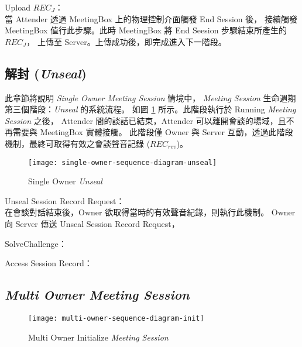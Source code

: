 \begin{steps}
    \item Upload $REC_{J}$：\\
        當 Attender 透過 MeetingBox 上的物理控制介面觸發 End Session 後，
        接續觸發 MeetingBox 值行此步驟。此時 MeetingBox 將 End Seesion 步驟結束所產生的 $REC_{J}$，
        上傳至 Server。上傳成功後，即完成進入下一階段。
\end{steps}


\subsection{解封 ({\it Unseal})}

    此章節將說明 {\it Single Owner Meeting Session} 情境中，
{\it Meeting Session} 生命週期第三個階段：{\it Unseal} 的系統流程。
如圖 \ref{fig.s-o-unseal} 所示。此階段執行於 Running {\it Meeting Session} 之後，
Attender 間的談話已結束，Attender 可以離開會談的場域，且不再需要與 MeetingBox 實體接觸。
此階段僅 Owner 與 Server 互動，透過此階段機制，最終可取得有效之會談聲音記錄 ($REC_{rev}$)。

\begin{figure}[H]
    \centering
    \texttt{[image: single-owner-sequence-diagram-unseal]}
    \caption{Single Owner {\it Unseal}}
    \label{fig.s-o-unseal}
\end{figure}

\begin{steps}
    \item Unseal Session Record Request：\\
        在會談對話結束後，Owner 欲取得當時的有效聲音紀錄，則執行此機制。
        Owner 向 Server 傳送 Unseal Session Record Request，

    \item SolveChallenge：\\

    \item Access Session Record：\\

\end{steps}


\subsection{{\it Multi Owner Meeting Session}}

\begin{figure}[H]
    \centering
    \texttt{[image: multi-owner-sequence-diagram-init]}
    \caption{Multi Owner Initialize {\it Meeting Session}}
    \label{fig.m-o-init}
\end{figure}

